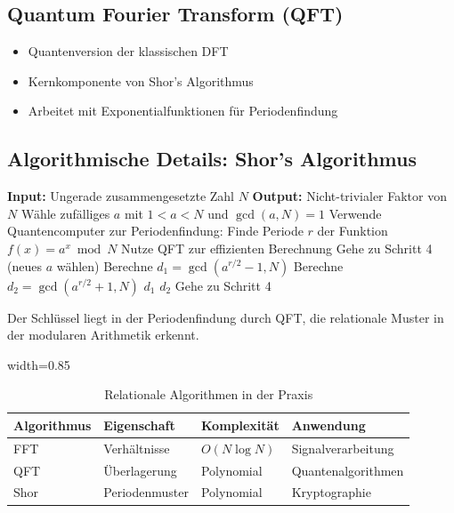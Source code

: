 	\subsection{Quantum Fourier Transform (QFT)}
	
	\begin{itemize}
		\item Quantenversion der klassischen DFT
		\item Kernkomponente von Shor's Algorithmus
		\item Arbeitet mit Exponentialfunktionen für Periodenfindung
	\end{itemize}
	
	\subsection{Algorithmische Details: Shor's Algorithmus}
	
	\begin{algorithm}[htbp]
		\caption{Shor's Algorithmus für Primfaktorisierung}
		\label{alg:shor}
		\begin{algorithmic}[1]
			\STATE \textbf{Input:} Ungerade zusammengesetzte Zahl $N$
			\STATE \textbf{Output:} Nicht-trivialer Faktor von $N$
			\STATE 
			\STATE Wähle zufälliges $a$ mit $1 < a < N$ und $\gcd(a,N) = 1$
			\STATE Verwende Quantencomputer zur Periodenfindung:
			\STATE \quad Finde Periode $r$ der Funktion $f(x) = a^x \bmod N$
			\STATE \quad Nutze QFT zur effizienten Berechnung
			\STATE Gehe zu Schritt 4 (neues $a$ wählen)
			\ENDIF
			\STATE Berechne $d_1 = \gcd(a^{r/2} - 1, N)$
			\STATE Berechne $d_2 = \gcd(a^{r/2} + 1, N)$
			\RETURN $d_1$
			\RETURN $d_2$
			\ELSE
			\STATE Gehe zu Schritt 4
			\ENDIF
		\end{algorithmic}
	\end{algorithm}
	
	Der Schlüssel liegt in der Periodenfindung durch QFT, die relationale Muster in der modularen Arithmetik erkennt.
	
	\begin{table}[htbp]
		\centering
		\begin{adjustbox}{width=0.85\textwidth}
			\begin{tabular}{llll}
				\toprule
				\textbf{Algorithmus} & \textbf{Eigenschaft} & \textbf{Komplexität} & \textbf{Anwendung} \\
				\midrule
				FFT & Verhältnisse & $O(N \log N)$ & Signalverarbeitung \\
				QFT & Überlagerung & Polynomial & Quantenalgorithmen \\
				Shor & Periodenmuster & Polynomial & Kryptographie \\
				\bottomrule
			\end{tabular}
		\end{adjustbox}
		\caption{Relationale Algorithmen in der Praxis}
		\label{tab:algorithmen}
	\end{table}
	
